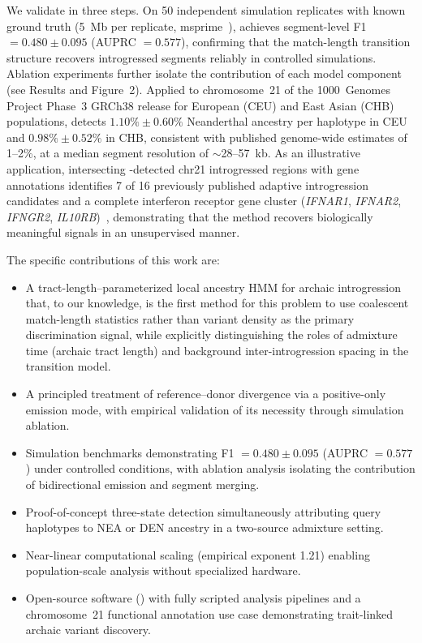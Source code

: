We validate \AP{} in three steps.
On 50 independent simulation replicates with known ground truth
(5~Mb per replicate, msprime~\citep{kelleher2016efficient}),
\AP{} achieves segment-level F1 $= 0.480 \pm 0.095$ (AUPRC $= 0.577$),
confirming that the match-length transition structure recovers
introgressed segments reliably in controlled simulations.
Ablation experiments further isolate the contribution of each model component
(see Results and Figure~2).
Applied to chromosome~21 of the 1000~Genomes Project Phase~3
GRCh38 release for European (CEU) and East Asian (CHB) populations,
\AP{} detects $1.10\% \pm 0.60\%$ Neanderthal ancestry per haplotype
in CEU and $0.98\% \pm 0.52\%$ in CHB, consistent with published
genome-wide estimates of 1--2\%, at a median segment resolution of $\sim$28--57~kb.
As an illustrative application, intersecting \AP{}-detected chr21
introgressed regions with gene annotations identifies 7 of 16 previously
published adaptive introgression candidates and a complete interferon
receptor gene cluster (\textit{IFNAR1}, \textit{IFNAR2},
\textit{IFNGR2}, \textit{IL10RB})~\citep{dannemann2017contribution},
demonstrating that the method recovers biologically meaningful signals
in an unsupervised manner.

The specific contributions of this work are:

\begin{itemize}
  \item A tract-length--parameterized local ancestry HMM for archaic introgression
    that, to our knowledge, is the first method for this problem to use
    coalescent match-length statistics rather than variant density
    as the primary discrimination signal, while explicitly distinguishing
    the roles of admixture time (archaic tract length) and background inter-introgression
    spacing in the transition model.
  \item A principled treatment of reference--donor divergence via a positive-only
    emission mode, with empirical validation of its necessity through simulation ablation.
  \item Simulation benchmarks demonstrating F1 $= 0.480 \pm 0.095$
    (AUPRC $= 0.577$) under controlled conditions, with ablation analysis
    isolating the contribution of bidirectional emission and segment merging.
  \item Proof-of-concept three-state detection simultaneously attributing query
    haplotypes to NEA or DEN ancestry in a two-source admixture setting.
  \item Near-linear computational scaling (empirical exponent 1.21) enabling
    population-scale analysis without specialized hardware.
  \item Open-source software (\AP{}) with fully scripted analysis pipelines
    and a chromosome~21 functional annotation use case demonstrating trait-linked
    archaic variant discovery.
\end{itemize}
